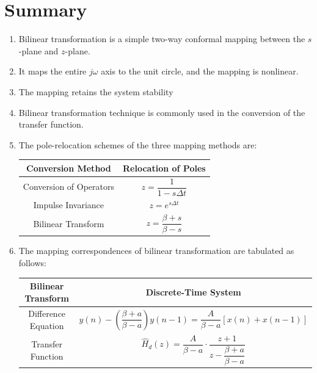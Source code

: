 \documentclass{article}
\begin{document}
\section{Summary}
\begin{enumerate}
    \item Bilinear transformation is a simple two-way conformal mapping between the \(s\)-plane and \(z\)-plane.
    \item It maps the entire \(j\omega\) axis to the unit circle, and the mapping is nonlinear.
    \item The mapping retains the system stability
    \item Bilinear transformation technique is commonly used in the conversion of the transfer function.
    \item The pole-relocation schemes of the three mapping methods are:
    \begin{table}[h]
    \centering
    \begin{tabular}{|c|c|}
    \hline
    \textbf{Conversion Method} & \textbf{Relocation of Poles} \\ \hline

    Conversion of Operators 
    & 
    $z = \dfrac{1}{1 - s\Delta t}$ 
    \\ \hline

    Impulse Invariance 
    & 
    $z = e^{s\Delta t}$ 
    \\ \hline

    Bilinear Transform 
    & 
    $z = \dfrac{\beta + s}{\beta - s}$ 
    \\ \hline

    \end{tabular}
    \end{table}
    \item The mapping correspondences of bilinear transformation are tabulated as follows:
    \begin{table}[h]
    \centering
    \begin{tabular}{|c|c|}
    \hline
    \textbf{Bilinear Transform} & \textbf{Discrete-Time System} \\ \hline

    Difference Equation
    &
    $y(n) - \left(\dfrac{\beta+a}{\beta-a}\right)y(n-1)
    =
    \dfrac{A}{\beta-a}\left[x(n)+x(n-1)\right]$
    \\ \hline

    Transfer Function
    &
    $\hat{H}_d(z)
    =
    \dfrac{A}{\beta-a}
    \cdot
    \dfrac{z+1}{
    z-\dfrac{\beta+a}{\beta-a}}$
    \\ \hline


\end{tabular}
\end{table}
\end{enumerate}
\end{document}
